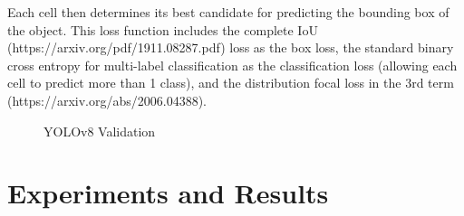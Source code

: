 \documentclass[10pt,twocolumn,letterpaper]{article}
\begin{document}
Each cell then determines its best candidate for predicting the bounding box of the object. This loss function includes the complete IoU (https://arxiv.org/pdf/1911.08287.pdf) loss as the box loss, the standard binary cross entropy for multi-label classification as the classification loss (allowing each cell to predict more than 1 class), and the distribution focal loss in the 3rd term (https://arxiv.org/abs/2006.04388).
    
\begin{figure}[h]
    \centering
    \qquad
    \caption{YOLOv8 Validation}%
    \label{fig:Model_Evaluation}
\end{figure}

\section{Experiments and Results}
\end{document}
